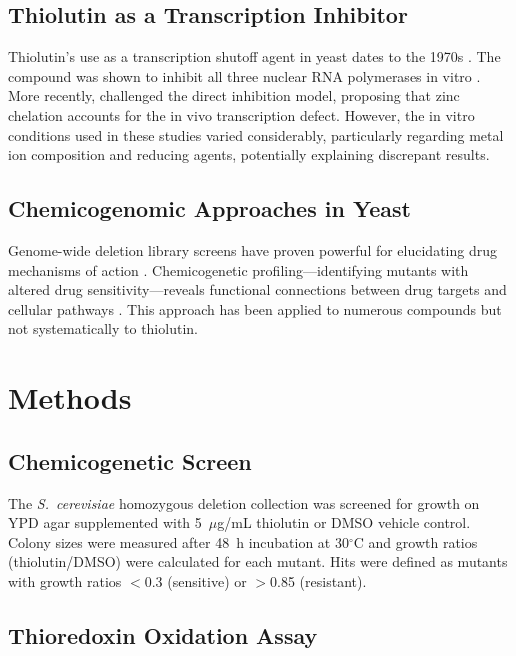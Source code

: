 \documentclass[11pt]{article}
\begin{document}
\subsection{Thiolutin as a Transcription Inhibitor}

Thiolutin's use as a transcription shutoff agent in yeast dates to the 1970s \citep{jimenez1973,tipper1973}. The compound was shown to inhibit all three nuclear RNA polymerases in vitro \citep{khachatourians1975}. More recently, \citet{lauinger2017} challenged the direct inhibition model, proposing that zinc chelation accounts for the in vivo transcription defect. However, the in vitro conditions used in these studies varied considerably, particularly regarding metal ion composition and reducing agents, potentially explaining discrepant results.

\subsection{Chemicogenomic Approaches in Yeast}

Genome-wide deletion library screens have proven powerful for elucidating drug mechanisms of action \citep{giaever2007,hillenmeyer2008}. Chemicogenetic profiling---identifying mutants with altered drug sensitivity---reveals functional connections between drug targets and cellular pathways \citep{costanzo2019}. This approach has been applied to numerous compounds but not systematically to thiolutin.

\section{Methods}

\subsection{Chemicogenetic Screen}

The \textit{S.~cerevisiae} homozygous deletion collection was screened for growth on YPD agar supplemented with 5~$\mu$g/mL thiolutin or DMSO vehicle control. Colony sizes were measured after 48~h incubation at 30$^{\circ}$C and growth ratios (thiolutin/DMSO) were calculated for each mutant. Hits were defined as mutants with growth ratios $<$0.3 (sensitive) or $>$0.85 (resistant).

\subsection{Thioredoxin Oxidation Assay}
\end{document}
